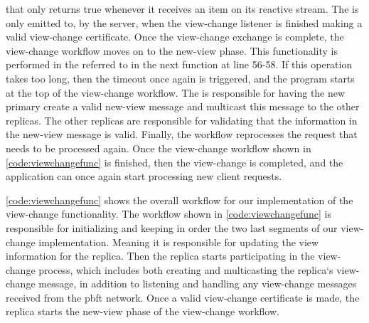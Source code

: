  that only returns true whenever it receives an item on its reactive stream. The  is only emitted to, by the server, when the view-change listener is finished making a valid view-change certificate. Once the view-change exchange is complete, the view-change workflow moves on to the new-view phase. This functionality is performed in the  referred to in the next  function at line 56-58. If this operation takes too long, then the timeout once again is triggered, and the program starts at the top of the view-change workflow. The  is responsible for having the new primary create a valid new-view message and multicast this message to the other replicas. The other replicas are responsible for validating that the information in the new-view message is valid. Finally, the workflow reprocesses the request that needs to be processed again. Once the view-change workflow shown in \autoref{code:viewchangefunc} is finished, then the view-change is completed, and the application can once again start processing new client requests.

\iffalse
\autoref{code:viewchangefunc} shows the overall workflow for our implementation of the view-change functionality.  The workflow shown in \autoref{code:viewchangefunc} is responsible for initializing and keeping in order the two last segments of our view-change implementation.  Meaning it is responsible for updating the view information for the replica. Then the replica starts participating in the view-change process, which includes both creating and multicasting the replica`s view-change message, in addition to listening and handling any view-change messages received from the \ac{pbft} network. Once a valid view-change certificate is made, the replica starts the new-view phase of the view-change workflow. 

